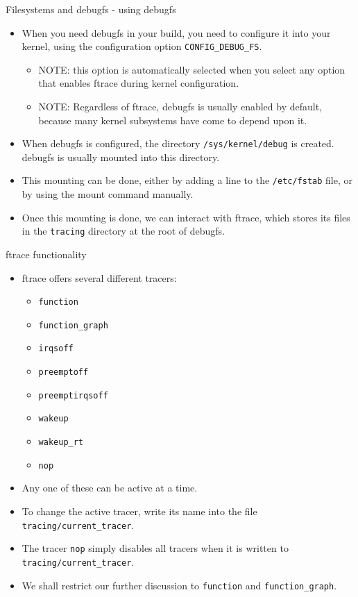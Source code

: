 \documentclass{beamer}
\begin{document}
\begin{frame}{Filesystems and debugfs - using debugfs}
  \begin{itemize}
  \item When you need debugfs in your build, you need to configure it
    into your kernel, using the configuration option \texttt{CONFIG\_DEBUG\_FS}.
    \begin{itemize}
    \item NOTE: this option is automatically selected when you select
      any option that enables ftrace during kernel configuration. %
    \item NOTE: Regardless of ftrace, debugfs is usually enabled by
      default, because many kernel subsystems have come to depend upon
      it. %
    \end{itemize}
  \item When debugfs is configured, the directory
    \texttt{/sys/kernel/debug} is created. debugfs is usually mounted
    into this directory.
  \item This mounting can be done, either by adding a line to the
    \texttt{/etc/fstab} file, or by using the mount command manually.
  \item Once this mounting is done, we can interact with ftrace, which
    stores its files in the \texttt{tracing} directory at the root of
    debugfs.
  \end{itemize}
\end{frame}

\begin{frame}{ftrace functionality}
  \begin{itemize}
  \item ftrace offers several different tracers:
    \begin{itemize}
    \item \texttt{function}
    \item \texttt{function\_graph}
    \item \texttt{irqsoff}
    \item \texttt{preemptoff}
    \item \texttt{preemptirqsoff}
    \item \texttt{wakeup}
    \item \texttt{wakeup\_rt}
    \item \texttt{nop}
    \end{itemize}
  \item Any one of these can be active at a time.
  \item To change the active tracer, write its name into the file
    \texttt{tracing/current\_tracer}.
  \item The tracer \texttt{nop} simply disables all tracers when it is
    written to \texttt{tracing/current\_tracer}.
  \item We shall restrict our further discussion to \texttt{function}
    and \texttt{function\_graph}.
  \end{itemize}
\end{frame}
\end{document}
